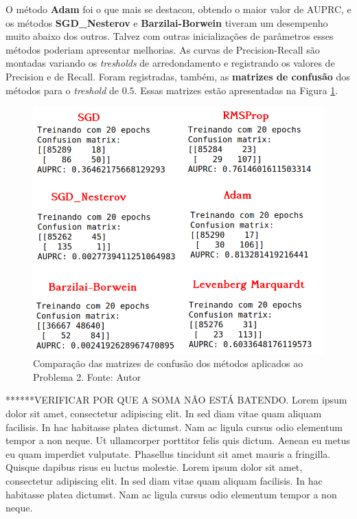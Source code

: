 \documentclass[11pt]{article}
\begin{document}
O método \textbf{Adam} foi o que mais se destacou, obtendo o maior valor de AUPRC, e os métodos \textbf{SGD\_Nesterov} e \textbf{Barzilai-Borwein} tiveram um desempenho muito abaixo dos outros. Talvez com outras inicializações de parâmetros esses métodos poderiam apresentar melhorias.
As curvas de Precision-Recall são montadas variando os \textit{tresholds} de arredondamento e registrando os valores de Precision e de Recall. Foram registradas, também, as \textbf{matrizes de confusão} dos métodos para o \textit{treshold} de $0.5$. Essas matrizes estão apresentadas na Figura \ref{CONFM}.


\begin{figure}[H]
\center
\includegraphics[scale=0.5]{Figuras/CONFMAT.png}
\caption{Comparação das matrizes de confusão dos métodos aplicados ao Problema 2. Fonte: Autor} 
\label{CONFM}
\end{figure}

******VERIFICAR POR QUE A SOMA NÃO ESTÁ BATENDO.
Lorem ipsum dolor sit amet, consectetur adipiscing elit. In sed diam vitae quam aliquam facilisis. In hac habitasse platea dictumst. Nam ac ligula cursus odio elementum tempor a non neque. Ut ullamcorper porttitor felis quis dictum. Aenean eu metus eu quam imperdiet vulputate. Phasellus tincidunt sit amet mauris a fringilla. Quisque dapibus risus eu luctus molestie. Lorem ipsum dolor sit amet, consectetur adipiscing elit. In sed diam vitae quam aliquam facilisis. In hac habitasse platea dictumst. Nam ac ligula cursus odio elementum tempor a non neque. 
\end{document}
